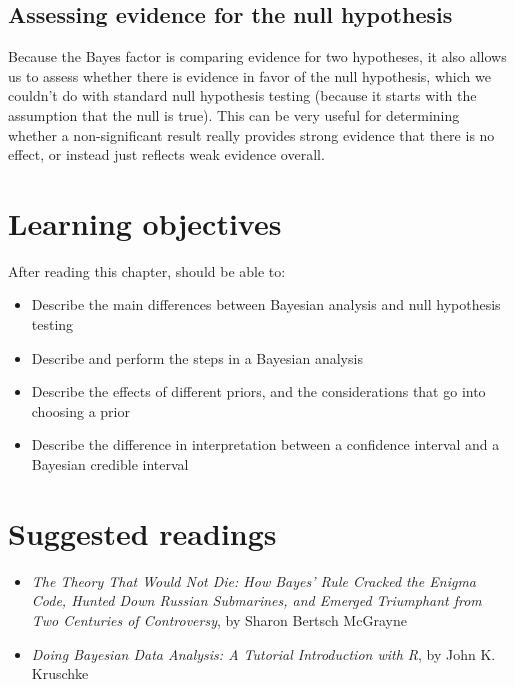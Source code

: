 \documentclass[
  12pt,
]{book}
\providecommand{\tightlist}{%
  \setlength{\itemsep}{0pt}\setlength{\parskip}{0pt}}
\begin{document}
\hypertarget{assessing-evidence-for-the-null-hypothesis}{%
\subsection{Assessing evidence for the null hypothesis}\label{assessing-evidence-for-the-null-hypothesis}}

Because the Bayes factor is comparing evidence for two hypotheses, it also allows us to assess whether there is evidence in favor of the null hypothesis, which we couldn't do with standard null hypothesis testing (because it starts with the assumption that the null is true). This can be very useful for determining whether a non-significant result really provides strong evidence that there is no effect, or instead just reflects weak evidence overall.

\hypertarget{learning-objectives-10}{%
\section{Learning objectives}\label{learning-objectives-10}}

After reading this chapter, should be able to:

\begin{itemize}
\tightlist
\item
  Describe the main differences between Bayesian analysis and null hypothesis testing
\item
  Describe and perform the steps in a Bayesian analysis
\item
  Describe the effects of different priors, and the considerations that go into choosing a prior
\item
  Describe the difference in interpretation between a confidence interval and a Bayesian credible interval
\end{itemize}

\hypertarget{suggested-readings-8}{%
\section{Suggested readings}\label{suggested-readings-8}}

\begin{itemize}
\tightlist
\item
  \emph{The Theory That Would Not Die: How Bayes' Rule Cracked the Enigma Code, Hunted Down Russian Submarines, and Emerged Triumphant from Two Centuries of Controversy}, by Sharon Bertsch McGrayne
\item
  \emph{Doing Bayesian Data Analysis: A Tutorial Introduction with R}, by John K. Kruschke
\end{itemize}
\end{document}
